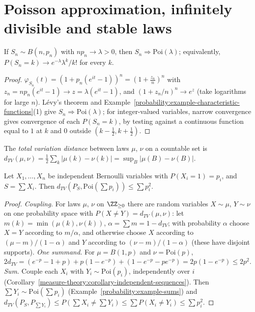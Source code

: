 \section{Poisson approximation, infinitely divisible and stable laws}\label{probability:section-poisson}

\begin{theorem}\label{probability:theorem-poisson-limit}
If $S_n \sim B(n, p_n)$ with $np_n \to \lambda > 0$, then $S_n \Rightarrow \mathrm{Poi}(\lambda)$; equivalently, $P(S_n = k) \to e^{-\lambda}\lambda^k/k!$ for every $k$.
\end{theorem}

\begin{proof}
$\varphi_{S_n}(t) = (1 + p_n(e^{it} - 1))^n = (1 + \frac{z_n}{n})^n$ with $z_n = np_n(e^{it} - 1) \to z = \lambda(e^{it} - 1)$, and $(1 + z_n/n)^n \to e^z$ (take logarithms for large $n$). L\'evy's theorem and
Example~\ref{probability:example-characteristic-functions}(1) give $S_n \Rightarrow \mathrm{Poi}(\lambda)$; for integer-valued variables, narrow convergence gives convergence of each $P(S_n = k)$, by testing against a continuous
function equal to $1$ at $k$ and $0$ outside $(k - \frac12, k + \frac12)$.
\end{proof}

\begin{definition}\label{probability:definition-total-variation}
The \emph{total variation distance} between laws $\mu$, $\nu$ on a countable set is $d_{TV}(\mu, \nu) = \frac12\sum_k|\mu(k) - \nu(k)| = \sup_B|\mu(B) - \nu(B)|$.
\end{definition}

\begin{proposition}[Le Cam]\label{probability:proposition-le-cam}
Let $X_1, \ldots, X_n$ be independent Bernoulli variables with $P(X_i = 1) = p_i$, and $S = \sum X_i$. Then $d_{TV}(P_S, \mathrm{Poi}(\sum p_i)) \leq \sum p_i^2$.
\end{proposition}

\begin{proof}
\emph{Coupling.} For laws $\mu$, $\nu$ on $\ZZ_{\geq 0}$ there are random variables $X \sim \mu$, $Y \sim \nu$ on one probability space with $P(X \neq Y) = d_{TV}(\mu, \nu)$: let $m(k) = \min(\mu(k), \nu(k))$, $\alpha = \sum m = 1 - d_{TV}$; with
probability $\alpha$ choose $X = Y$ according to $m/\alpha$, and otherwise choose $X$ according to $(\mu - m)/(1 - \alpha)$ and $Y$ according to $(\nu - m)/(1 - \alpha)$ (these have disjoint supports). \emph{One summand.} For
$\mu = B(1, p)$ and $\nu = \mathrm{Poi}(p)$, $2d_{TV} = (e^{-p} - 1 + p) + p(1 - e^{-p}) + (1 - e^{-p} - pe^{-p}) = 2p(1 - e^{-p}) \leq 2p^2$. \emph{Sum.} Couple each $X_i$ with $Y_i \sim \mathrm{Poi}(p_i)$, independently over $i$
(Corollary~\ref{measure-theory:corollary-independent-sequences}). Then $\sum Y_i \sim \mathrm{Poi}(\sum p_i)$ (Example~\ref{probability:example-sums}) and
$d_{TV}(P_S, P_{\sum Y_i}) \leq P(\sum X_i \neq \sum Y_i) \leq \sum P(X_i \neq Y_i) \leq \sum p_i^2$.
\end{proof}

